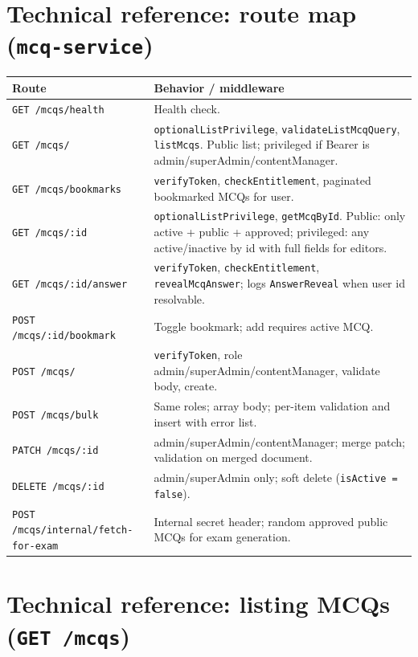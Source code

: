 \documentclass[11pt,a4paper]{article}
\begin{document}
\section{Technical reference: route map (\texttt{mcq-service})}

\begin{longtable}{@{}p{}p{}@{}}
\toprule
\textbf{Route} & \textbf{Behavior / middleware} \\
\midrule
\endhead
\texttt{GET /mcqs/health} & Health check. \\
\texttt{GET /mcqs/} & \texttt{optionalListPrivilege}, \texttt{validateListMcqQuery}, \texttt{listMcqs}. Public list; privileged if Bearer is admin/superAdmin/contentManager. \\
\texttt{GET /mcqs/bookmarks} & \texttt{verifyToken}, \texttt{checkEntitlement}, paginated bookmarked MCQs for user. \\
\texttt{GET /mcqs/:id} & \texttt{optionalListPrivilege}, \texttt{getMcqById}. Public: only active + public + approved; privileged: any active/inactive by id with full fields for editors. \\
\texttt{GET /mcqs/:id/answer} & \texttt{verifyToken}, \texttt{checkEntitlement}, \texttt{revealMcqAnswer}; logs \texttt{AnswerReveal} when user id resolvable. \\
\texttt{POST /mcqs/:id/bookmark} & Toggle bookmark; add requires active MCQ. \\
\texttt{POST /mcqs/} & \texttt{verifyToken}, role admin/superAdmin/contentManager, validate body, create. \\
\texttt{POST /mcqs/bulk} & Same roles; array body; per-item validation and insert with error list. \\
\texttt{PATCH /mcqs/:id} & admin/superAdmin/contentManager; merge patch; validation on merged document. \\
\texttt{DELETE /mcqs/:id} & admin/superAdmin only; soft delete (\texttt{isActive = false}). \\
\texttt{POST /mcqs/internal/fetch-for-exam} & Internal secret header; random approved public MCQs for exam generation. \\
\bottomrule
\end{longtable}

\section{Technical reference: listing MCQs (\texttt{GET /mcqs})}
\end{document}
